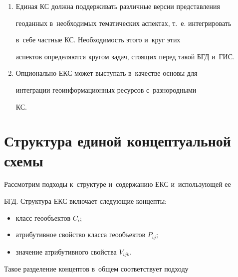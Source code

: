 \begin{enumerate}[1.]
1:200\,000, 1:500\,000, 1:1\,000\,000. Вторая очередь ЕКС предполагает 


обеспечение крупномасштабных геоданных (масштабы 1:500--1:5\,000). 


В~перспективе целесообразен охват более мелких масштабов 


об\-зор\-но-гео\-гра\-фи\-че\-ских карт (до 1:10\,000\,000 и~мельче). 


  \item Единая КС должна поддерживать различные версии представления 


геоданных в~необходимых тематических аспектах, т.~е. интегрировать 


в~себе частные КС. Необходимость этого и~круг этих 


аспектов определяются кругом задач, стоящих перед такой БГД и~ГИС.


  \item Опционально ЕКС может выступать в~качестве основы для 


интеграции геоинформационных ресурсов с~разнородными 


КС.


  \end{enumerate}





\section{Структура единой концептуальной схемы}


     


  Рассмотрим подходы к~структуре и~содержанию ЕКС и~использующей ее 


БГД. Структура ЕКС включает следующие концепты:


  \begin{itemize}


  \item класс геообъектов $C_i$;


  \item атрибутивное свойство класса геообъектов $P_{ij }$; 


  \item значение атрибутивного свойства $V_{ijk }$.


  \end{itemize}


  


  Такое разделение концептов в~общем соответствует подходу 


